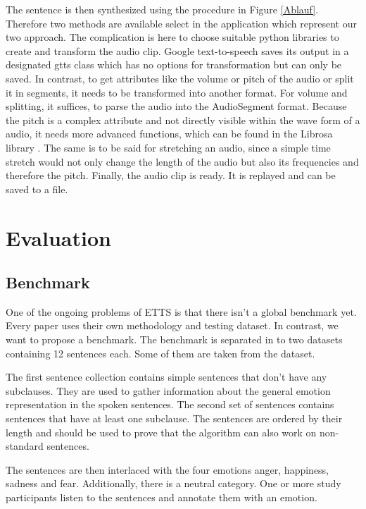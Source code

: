 \documentclass[11pt]{article}
\begin{document}
The sentence is then synthesized using the procedure in Figure \ref{Ablauf}. Therefore two methods are available select in the application which represent our two approach. The complication is here to choose suitable python libraries to create and transform the audio clip. Google text-to-speech \cite{gtts} saves its output in a designated gtts class which has no options for transformation but can only be saved. In contrast, to get attributes like the volume or pitch of the audio or split it in segments, it needs to be transformed into another format. For volume and splitting, it suffices, to parse the audio into the AudioSegment format. Because the pitch is a complex attribute and not directly visible within the wave form of a audio, it needs more advanced functions, which can be found in the Librosa library \cite{McFee2015librosaAA}. The same is to be said for stretching an audio, since a simple time stretch would not only change the length of the audio but also its frequencies and therefore the pitch.
Finally, the audio clip is ready. It is replayed and can be saved to a file.

\section{Evaluation}
\label{evaluation}

\subsection{Benchmark}
One of the ongoing problems of ETTS is that there isn't a global benchmark yet\cite{triantafyllopoulos_overview_2023}. Every paper uses their own methodology and testing dataset. In contrast, we want to propose a benchmark. The benchmark is separated in to two datasets containing 12 sentences each. Some of them are taken from the \cite{saravia-etal-2018-carer} dataset.

The first sentence collection contains simple sentences that don't have any subclauses. They are used to gather information about the general emotion representation in the spoken sentences. The second set of sentences contains sentences that have at least one subclause. The sentences are ordered by their length and should be used to prove that the algorithm can also work on non-standard sentences.

The sentences are then interlaced with the four emotions anger, happiness, sadness and fear. Additionally, there is a neutral category. One or more study participants listen to the sentences and annotate them with an emotion.
\end{document}

